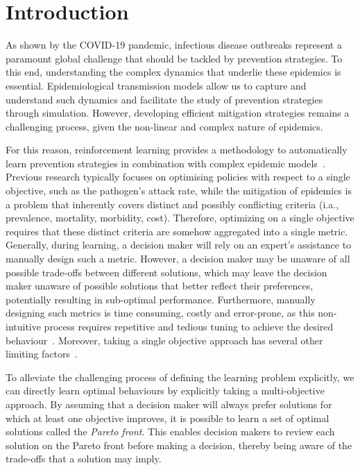 \documentclass{article}
\renewcommand{\cite}[1]{\citep{#1}}
\begin{document}
\section{Introduction}
As shown by the COVID-19 pandemic, infectious disease outbreaks represent a paramount global challenge that should be tackled by prevention strategies. To this end, understanding the complex dynamics that underlie these epidemics is essential. Epidemiological transmission models allow us to capture and understand such dynamics and facilitate the study of prevention strategies through simulation. However, developing efficient mitigation strategies remains a challenging process, given the non-linear and complex nature of epidemics. 

For this reason, reinforcement learning provides a methodology to automatically learn prevention strategies in combination with complex epidemic models~\cite{libin2020}.
Previous research typically focuses on optimising policies with respect to a single objective, such as the pathogen's attack rate, while the mitigation of epidemics is a problem that inherently covers distinct  and possibly conflicting criteria (i.a., prevalence, mortality, morbidity, cost). Therefore, optimizing on a single objective requires that  these distinct criteria are somehow aggregated into a single metric.
Generally, during learning, a decision maker will rely on an expert's assistance to manually design such a metric. However, a decision maker may
be unaware of all possible trade-offs between different solutions, which may leave the decision maker unaware of possible solutions that better reflect their preferences, potentially resulting in sub-optimal performance. Furthermore, manually designing such metrics is time consuming, costly and error-prone, as this non-intuitive process requires repetitive and tedious tuning to achieve the desired behaviour~\cite{hayes2021practical}. Moreover, taking a single objective approach has several other limiting factors~\cite{hayes2021practical,roijers2013survey}. 

To alleviate the challenging process of defining the learning problem explicitly, we can directly learn optimal behaviours by explicitly taking a multi-objective approach. By assuming that a decision maker will always prefer solutions for which at least one objective improves, it is possible to learn a set of optimal solutions called the \emph{Pareto front}. This enables decision makers to review each solution on the Pareto front before making a decision, thereby being aware of the trade-offs that a solution may imply. 
\end{document}
